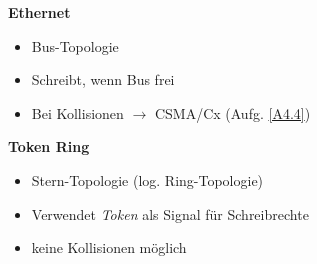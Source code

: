 
\begin{multicols}{2}
\textbf{Ethernet}
\begin{itemize}
\item Bus-Topologie
\item Schreibt, wenn Bus frei
\item Bei Kollisionen $\rightarrow$ CSMA/Cx (Aufg. \ref{A4.4})
\end{itemize}

\columnbreak

\textbf{Token Ring}
\begin{itemize}
\item Stern-Topologie (log. Ring-Topologie)
\item Verwendet \emph{Token} als Signal für Schreibrechte
\item keine Kollisionen möglich
\end{itemize}
\end{multicols}
